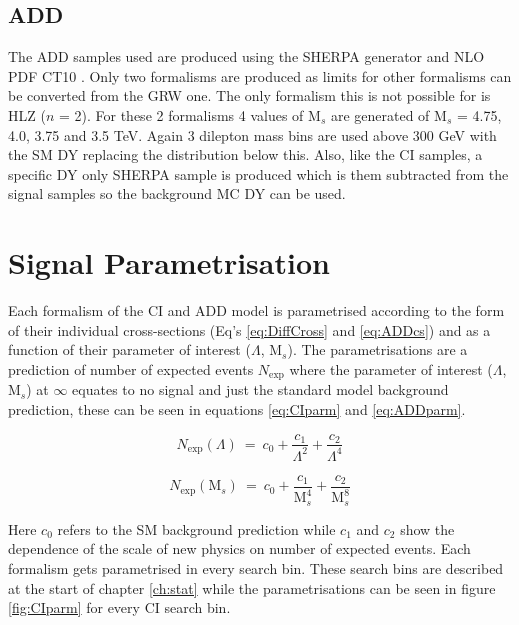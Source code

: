 	\subsection*{ADD}

	The ADD samples used are produced using the SHERPA \cite{} generator and NLO PDF CT10 \cite{}. Only two formalisms are produced as limits for other formalisms can be converted from the GRW one. The only formalism this is not possible for is HLZ ($n$ = 2). For these 2 formalisms 4 values of M$_{s}$ are generated of M$_{s}$ = 4.75, 4.0, 3.75 and 3.5 TeV. Again 3 dilepton mass bins are used above 300 GeV with the SM DY replacing the distribution below this. Also, like the CI samples, a specific DY only SHERPA sample is produced which is them subtracted from the signal samples so the background MC DY can be used.



\section{Signal Parametrisation}
	\label{sec:parm}

	Each formalism of the CI and ADD model is parametrised according to the form of their individual cross-sections (Eq's \ref{eq:DiffCross} and \ref{eq:ADDcs}) and as a function of their parameter of interest ($\Lambda$, M$_{s}$). The parametrisations are a prediction of number of expected events $N_{\text{exp}}$ where the parameter of interest ($\Lambda$, M$_{s}$) at $\infty$ equates to no signal and just the standard model background prediction, these can be seen in equations \ref{eq:CIparm} and \ref{eq:ADDparm}. 

	\begin{equation}
        N_{\text{exp}}(\Lambda)~=~c_{0} + \frac{c_{1}}{\Lambda^{2}} + \frac{c_{2}}{\Lambda^{4}}
        \label{eq:CIparm}
    \end{equation}

    \begin{equation}
        N_{\text{exp}}(\text{M}_{s})~=~c_{0} + \frac{c_{1}}{\text{M}_{s}^{4}} + \frac{c_{2}}{\text{M}_{s}^{8}}
        \label{eq:ADDparm}
    \end{equation}

	Here $c_{0}$ refers to the SM background prediction while $c_{1}$ and $c_{2}$ show the dependence of the scale of new physics on number of expected events. Each formalism gets parametrised in every search bin. These search bins are described at the start of chapter \ref{ch:stat} while the parametrisations can be seen in figure \ref{fig:CIparm} for every CI search bin.


